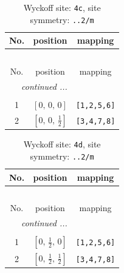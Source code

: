 \documentclass[fleqn,8pt]{jsarticle}
\begin{document}
\renewcommand{\arraystretch}{1.2}
\begin{longtable}{ccc}
\caption{Wyckoff site: {\tt 4c}, site symmetry: {\tt ..2/m}}
 \\
 \hline \hline
No. & position & mapping \\ \hline \endfirsthead

\multicolumn{2}{l}{\tablename\ \thetable{}} \\
 \hline \hline
No. & position & mapping \\ \hline \endhead

 \hline \hline
\multicolumn{2}{r}{\footnotesize\it continued ...} \\ \endfoot

 \hline \hline
\multicolumn{2}{r}{} \\ \endlastfoot

1 & $\left[ 0,\, 0,\, 0 \right]$ & {\tt [1,2,5,6]} \\ \hline
2 & $\left[ 0,\, 0,\, \frac{1}{2} \right]$ & {\tt [3,4,7,8]} \\
\end{longtable}
\renewcommand{\arraystretch}{1.2}
\begin{longtable}{ccc}
\caption{Wyckoff site: {\tt 4d}, site symmetry: {\tt ..2/m}}
 \\
 \hline \hline
No. & position & mapping \\ \hline \endfirsthead

\multicolumn{2}{l}{\tablename\ \thetable{}} \\
 \hline \hline
No. & position & mapping \\ \hline \endhead

 \hline \hline
\multicolumn{2}{r}{\footnotesize\it continued ...} \\ \endfoot

 \hline \hline
\multicolumn{2}{r}{} \\ \endlastfoot

1 & $\left[ 0,\, \frac{1}{2},\, 0 \right]$ & {\tt [1,2,5,6]} \\ \hline
2 & $\left[ 0,\, \frac{1}{2},\, \frac{1}{2} \right]$ & {\tt [3,4,7,8]} \\
\end{longtable}
\renewcommand{\arraystretch}{1.2}
\end{document}
